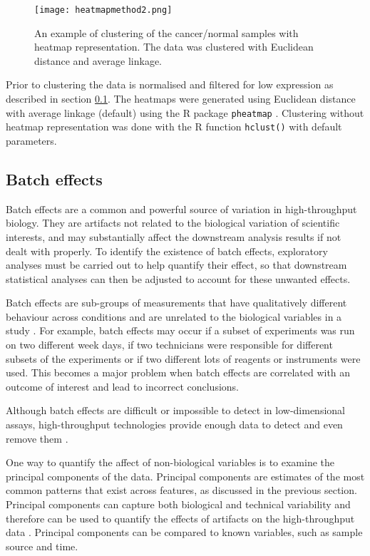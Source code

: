         \begin{figure}[h]
        \centering
        \texttt{[image: heatmapmethod2.png]}
        \caption{An example of clustering of the cancer/normal samples with heatmap representation. The data was clustered with Euclidean distance and average linkage. }
        \label{fig:heatmapmethod}
        \end{figure}
    
    Prior to clustering the data is normalised and filtered for low expression as described in  section \ref{}. The heatmaps were generated using Euclidean distance with average linkage (default) using the R package  \texttt{pheatmap} \cite{kolde2012pheatmap}. Clustering without heatmap representation was done with the R function \texttt{hclust()} with default parameters.


   

\newpage


\subsection{Batch effects}

Batch effects are a common and powerful source of variation in high-throughput biology.  They are artifacts not related to the biological variation of scientific interests, and may substantially affect the downstream analysis results if not dealt with properly. 
To identify the existence of batch effects, exploratory analyses must be carried out to help quantify their effect, so that downstream statistical analyses can then be adjusted to account for these unwanted effects. 
 
Batch effects are sub-groups of measurements that have qualitatively different behaviour across conditions and are unrelated to the biological variables in a study \cite{Leek2010}. For example, batch effects may occur if a subset of experiments was run on two different week days, if two technicians were responsible for different subsets of the experiments or if two different lots of reagents or instruments were used. This becomes a major problem when batch effects are correlated with an outcome of interest and lead to incorrect conclusions.
 
Although batch effects are difficult or impossible to detect in low-dimensional assays, high-throughput technologies provide enough data to detect and even remove them \cite{Leek2010}. 
 
One way to quantify the affect of non-biological variables is to examine the principal components of the data. Principal components are estimates of the most common patterns that exist across features, as discussed in the previous section. Principal components can capture both biological and technical variability and therefore can be used to quantify the effects of artifacts on the high-throughput data \cite{LeekCapturingAnalysis}. Principal components can be compared to known variables, such as sample source and time. 
 
